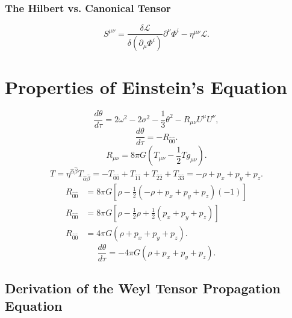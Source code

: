 \documentclass[11pt, a4paper]{report}
\begin{document}
\subsubsection*{The Hilbert vs. Canonical Tensor}
\begin{equation}
S^{\mu\nu} = \frac{\delta \mathcal{L}}{\delta(\partial_{\mu}\Phi^{i})} \partial^{\nu}\Phi^{i} - \eta^{\mu\nu}\mathcal{L}.
\end{equation}

\section{Properties of Einstein's Equation}
\begin{equation}
\label{eq:raychaudhuri}
\frac{d\theta}{d\tau} = 2\omega^{2} - 2\sigma^{2} - \frac{1}{3}\theta^{2} - R_{\mu\nu}U^{\mu}U^{\nu},
\end{equation}
\begin{equation}
\frac{d\theta}{d\tau} = -R_{\hat{0}\hat{0}}.
\end{equation}
\begin{equation}
R_{\mu\nu} = 8\pi G \left( T_{\mu\nu} - \frac{1}{2}T g_{\mu\nu} \right).
\end{equation}
\begin{equation}
T = \eta^{\hat{\alpha}\hat{\beta}}T_{\hat{\alpha}\hat{\beta}} = -T_{\hat{0}\hat{0}} + T_{\hat{1}\hat{1}} + T_{\hat{2}\hat{2}} + T_{\hat{3}\hat{3}} = -\rho + p_{x} + p_{y} + p_{z}.
\end{equation}
\begin{align}
R_{\hat{0}\hat{0}} &= 8\pi G \left[ \rho - \frac{1}{2}(-\rho + p_{x} + p_{y} + p_{z})(-1) \right] \nonumber \\
R_{\hat{0}\hat{0}} &= 8\pi G \left[ \rho - \frac{1}{2}\rho + \frac{1}{2}(p_{x} + p_{y} + p_{z}) \right] \nonumber \\
R_{\hat{0}\hat{0}} &= 4\pi G (\rho + p_{x} + p_{y} + p_{z}).
\end{align}
\begin{equation}
\label{eq:expansion_gravity}
\frac{d\theta}{d\tau} = -4\pi G (\rho + p_{x} + p_{y} + p_{z}).
\end{equation}

\subsection{Derivation of the Weyl Tensor Propagation Equation}
\end{document}
